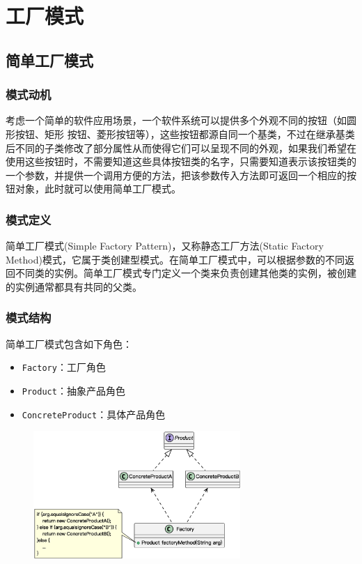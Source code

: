 \section{工厂模式}

\subsection{简单工厂模式}

\subsubsection{模式动机}
考虑一个简单的软件应用场景，一个软件系统可以提供多个外观不同的按钮（如圆形按钮、矩形 按钮、菱形按钮等），这些按钮都源自同一个基类，不过在继承基类后不同的子类修改了部分属性从而使得它们可以呈现不同的外观，如果我们希望在使用这些按钮时，不需要知道这些具体按钮类的名字，只需要知道表示该按钮类的一个参数，并提供一个调用方便的方法，把该参数传入方法即可返回一个相应的按钮对象，此时就可以使用简单工厂模式。

\subsubsection{模式定义}
简单工厂模式(Simple Factory Pattern)，又称静态工厂方法(Static Factory Method)模式，它属于类创建型模式。在简单工厂模式中，可以根据参数的不同返回不同类的实例。简单工厂模式专门定义一个类来负责创建其他类的实例，被创建的实例通常都具有共同的父类。

\subsubsection{模式结构}
简单工厂模式包含如下角色：
\begin{itemize}
    \item \verb|Factory|：工厂角色
    \item \verb|Product|：抽象产品角色
    \item \verb|ConcreteProduct|：具体产品角色
\end{itemize}

\begin{figure}[H]
    \vspace{-0.5em}
	\centering
	\includegraphics[width=0.7\textwidth]{images/简单工厂模式.eps}
    \vspace{-1em}
\end{figure}

